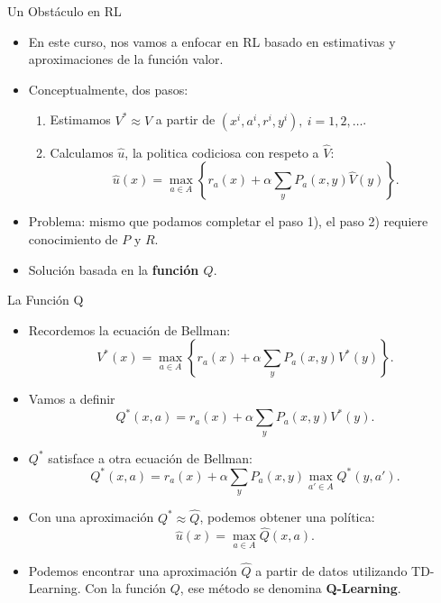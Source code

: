 \documentclass[handout]{beamer}
\begin{document}
\begin{frame}{Un Obstáculo en RL}
\begin{itemize}
\item En este curso, nos vamos a enfocar en RL basado en estimativas y aproximaciones de la función valor.
\item<2-> Conceptualmente, dos pasos:
\begin{enumerate}
\item<3-> Estimamos $V^* \approx \hat V$ a partir de $(x^i,a^i,r^i,y^i),~i=1,2,\dots$. 
\item<4-> Calculamos $\hat u$, la politica codiciosa con respeto a $\hat V$:
$$
\hat u(x) = \max_{a \in A} \left\{r_a(x) + \alpha \sum_y P_a(x,y) \hat V(y)\right\}.
$$
\end{enumerate}
\item<5-> Problema: mismo que podamos completar el paso 1), el paso 2) requiere conocimiento de $P$ y $R$.   
\item<6-> Solución basada en la \textbf{función $Q$}.
\end{itemize}
\end{frame}

\begin{frame}{La Función Q}
\begin{itemize}
\item Recordemos la ecuación de Bellman:
$$V^*(x) =  \max\limits_{a \in A} \left\{r_a(x)+\alpha \sum_y P_a(x,y) V^*(y)\right\}.$$
\item<2-> Vamos a definir 
$$Q^*(x,a) = r_a(x)+\alpha \sum_y P_a(x,y) V^*(y).$$
\item<3->  $Q^*$ satisface a otra ecuación de Bellman:
$$Q^*(x,a) = r_a(x)+\alpha \sum_y P_a(x,y) \max_{a' \in A} Q^*(y,a').$$
\item<4-> Con una aproximación $Q^* \approx \hat Q$, podemos obtener una política:
$$
\hat u(x) = \max_{a \in A} \hat Q(x,a).
$$
\item<5-> Podemos encontrar una aproximación $\hat Q$ a partir de datos utilizando TD-Learning. Con la función $Q$, ese método se denomina \textbf{Q-Learning}.
\end{itemize}    
\end{frame}
\end{document}
